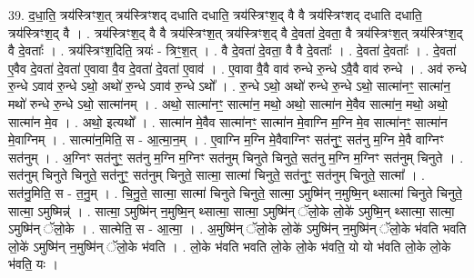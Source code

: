 \documentclass[17pt]{extarticle}
\begin{document}
39. द॒धा॒ति॒ त्रय॑स्त्रिꣳश॒त् त्रय॑स्त्रिꣳशद् दधाति दधाति॒ त्रय॑स्त्रिꣳश॒द् वै वै त्रय॑स्त्रिꣳशद् दधाति दधाति॒ त्रय॑स्त्रिꣳश॒द् वै । . त्रय॑स्त्रिꣳश॒द् वै वै त्रय॑स्त्रिꣳश॒त् त्रय॑स्त्रिꣳश॒द् वै दे॒वता॑ दे॒वता॒ वै त्रय॑स्त्रिꣳश॒त् त्रय॑स्त्रिꣳश॒द् वै दे॒वताः᳚ । . त्रय॑स्त्रिꣳश॒दिति॒ त्रयः॑ - त्रिꣳ॒॒श॒त् । . वै दे॒वता॑ दे॒वता॒ वै वै दे॒वताः᳚ । . दे॒वता॑ दे॒वताः᳚ । . दे॒वता॑ ए॒वैव दे॒वता॑ दे॒वता॑ ए॒वावा वै॒व दे॒वता॑ दे॒वता॑ ए॒वाव॑ । . ए॒वावा वै॒वै वाव॑ रुन्धे रु॒न्धे ऽवै॒वै वाव॑ रुन्धे । . अव॑ रुन्धे रु॒न्धे ऽवाव॑ रु॒न्धे ऽथो॒ अथो॑ रु॒न्धे ऽवाव॑ रु॒न्धे ऽथो᳚ । . रु॒न्धे ऽथो॒ अथो॑ रुन्धे रु॒न्धे ऽथो॒ सात्मा॑नꣳ॒॒ सात्मा॑न॒ मथो॑ रुन्धे रु॒न्धे ऽथो॒ सात्मा॑नम् । . अथो॒ सात्मा॑नꣳ॒॒ सात्मा॑न॒ मथो॒ अथो॒ सात्मा॑न मे॒वैव सात्मा॑न॒ मथो॒ अथो॒ सात्मा॑न मे॒व । . अथो॒ इत्यथो᳚ । . सात्मा॑न मे॒वैव सात्मा॑नꣳ॒॒ सात्मा॑न मे॒वाग्नि म॒ग्नि मे॒व सात्मा॑नꣳ॒॒ सात्मा॑न मे॒वाग्निम् । . सात्मा॑न॒मिति॒ स - आ॒त्मा॒न॒म् । . ए॒वाग्नि म॒ग्नि मे॒वैवाग्निꣳ सत॑नुꣳ॒॒ सत॑नु म॒ग्नि मे॒वै वाग्निꣳ सत॑नुम् । . अ॒ग्निꣳ सत॑नुꣳ॒॒ सत॑नु म॒ग्नि म॒ग्निꣳ सत॑नुम् चिनुते चिनुते॒ सत॑नु म॒ग्नि म॒ग्निꣳ सत॑नुम् चिनुते । . सत॑नुम् चिनुते चिनुते॒ सत॑नुꣳ॒॒ सत॑नुम् चिनुते॒ सात्मा॒ सात्मा॑ चिनुते॒ सत॑नुꣳ॒॒ सत॑नुम् चिनुते॒ सात्मा᳚ । . सत॑नु॒मिति॒ स - त॒नु॒म् । . चि॒नु॒ते॒ सात्मा॒ सात्मा॑ चिनुते चिनुते॒ सात्मा॒ ऽमुष्मि॑न् न॒मुष्मि॒न् थ्सात्मा॑ चिनुते चिनुते॒ सात्मा॒ ऽमुष्मिन्न्॑ । . सात्मा॒ ऽमुष्मि॑न् न॒मुष्मि॒न् थ्सात्मा॒ सात्मा॒ ऽमुष्मि॑न् ॅलो॒के लो॒के॑ ऽमुष्मि॒न् थ्सात्मा॒ सात्मा॒ ऽमुष्मि॑न् ॅलो॒के । . सात्मेति॒ स - आ॒त्मा॒ । . अ॒मुष्मि॑न् ॅलो॒के लो॒के॑ ऽमुष्मि॑न् न॒मुष्मि॑न् ॅलो॒के भ॑वति भवति लो॒के॑ ऽमुष्मि॑न् न॒मुष्मि॑न् ॅलो॒के भ॑वति । . लो॒के भ॑वति भवति लो॒के लो॒के भ॑वति॒ यो यो भ॑वति लो॒के लो॒के भ॑वति॒ यः । \newline
\pagebreak
{}
\end{document}
